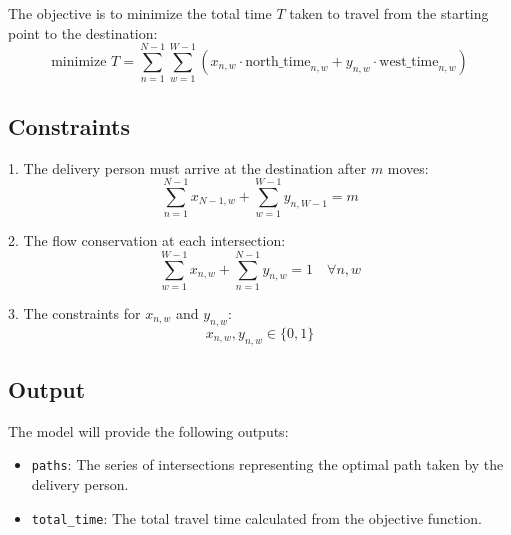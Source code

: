 \documentclass{article}
\begin{document}
The objective is to minimize the total time \( T \) taken to travel from the starting point to the destination:
\[
\text{minimize } T = \sum_{n=1}^{N-1} \sum_{w=1}^{W-1} (x_{n,w} \cdot \text{north\_time}_{n,w} + y_{n,w} \cdot \text{west\_time}_{n,w})
\]

\subsection*{Constraints}

1. The delivery person must arrive at the destination after \( m \) moves:
\[
\sum_{n=1}^{N-1} x_{N-1,w} + \sum_{w=1}^{W-1} y_{n,W-1} = m
\]

2. The flow conservation at each intersection:
\[
\sum_{w=1}^{W-1} x_{n,w} + \sum_{n=1}^{N-1} y_{n,w} = 1 \quad \forall n, w
\]

3. The constraints for \( x_{n,w} \) and \( y_{n,w} \):
\[
x_{n,w}, y_{n,w} \in \{0, 1\}
\]

\subsection*{Output}

The model will provide the following outputs:

\begin{itemize}
    \item \texttt{paths}: The series of intersections representing the optimal path taken by the delivery person.
    \item \texttt{total\_time}: The total travel time calculated from the objective function.
\end{itemize}
\end{document}
